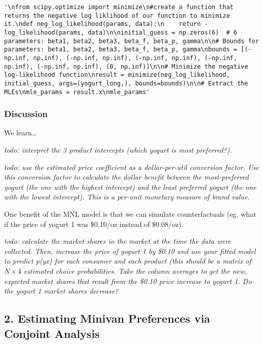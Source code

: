 \documentclass[
  letterpaper,
  DIV=11,
  numbers=noendperiod]{scrartcl}
\begin{document}
\begin{verbatim}
'\nfrom scipy.optimize import minimize\n#create a function that returns the negative log liklihood of our function to minimize it.\ndef neg_log_likelihood(params, data):\n    return -log_likelihood(params, data)\n\ninitial_guess = np.zeros(6)  # 6 parameters: beta1, beta2, beta3, beta_f, beta_p, gamma\n\n# Bounds for parameters: beta1, beta2, beta3, beta_f, beta_p, gamma\nbounds = [(-np.inf, np.inf), (-np.inf, np.inf), (-np.inf, np.inf), (-np.inf, np.inf), (-np.inf, np.inf), (0, np.inf)]\n\n# Minimize the negative log-likelihood function\nresult = minimize(neg_log_likelihood, initial_guess, args=(yogurt_long,), bounds=bounds)\n\n# Extract the MLEs\nmle_params = result.x\nmle_params'
\end{verbatim}

\subsubsection{Discussion}\label{discussion}

We learn\ldots{}

\emph{todo: interpret the 3 product intercepts (which yogurt is most
preferred?).}

\emph{todo: use the estimated price coefficient as a dollar-per-util
conversion factor. Use this conversion factor to calculate the dollar
benefit between the most-preferred yogurt (the one with the highest
intercept) and the least preferred yogurt (the one with the lowest
intercept). This is a per-unit monetary measure of brand value.}

One benefit of the MNL model is that we can simulate counterfactuals
(eg, what if the price of yogurt 1 was \$0.10/oz instead of \$0.08/oz).

\emph{todo: calculate the market shares in the market at the time the
data were collected. Then, increase the price of yogurt 1 by \$0.10 and
use your fitted model to predict p(y\textbar x) for each consumer and
each product (this should be a matrix of \(N \times 4\) estimated choice
probabilities. Take the column averages to get the new, expected market
shares that result from the \$0.10 price increase to yogurt 1. Do the
yogurt 1 market shares decrease?}

\subsection{2. Estimating Minivan Preferences via Conjoint
Analysis}\label{estimating-minivan-preferences-via-conjoint-analysis}
\end{document}
